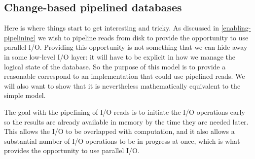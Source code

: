 \documentclass[11pt,a4paper]{article}
\begin{document}
\subsection{Change-based pipelined databases}

Here is where things start to get interesting and tricky. As discussed in
\cref{enabling-pipelining} we wish to pipeline reads from disk to provide the
opportunity to use parallel I/O. Providing this opportunity is not something
that we can hide away in some low-level I/O layer: it will have to be explicit
in how we manage the logical state of the database. So the purpose of this
model is to provide a reasonable correspond to an implementation that could use
pipelined reads. We will also want to show that it is nevertheless
mathematically equivalent to the simple model.

The goal with the pipelining of I/O reads is to initiate the I/O operations
early so the results are already available in memory by the time they are
needed later. This allows the I/O to be overlapped with computation, and it
also allows a substantial number of I/O operations to be in progress at once,
which is what provides the opportunity to use parallel I/O.
\end{document}
